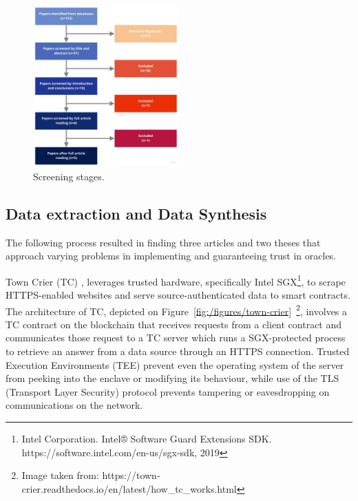 \documentclass[final,3p,12pt,twocolumn]{elsarticle}
\begin{document}
\begin{figure}[H]
  \begin{center}
    \leavevmode
    \includegraphics[width=0.5\textwidth]{figures/paper-screening.jpg}
    \caption{Screening stages.}
    \label{fig:/figures/paper-screening}
  \end{center}
\end{figure}


\subsection{Data extraction and Data Synthesis}\label{data-synthesis}

The following process resulted in finding three articles and two theses that approach varying problems in implementing and guaranteeing trust in oracles.

Town Crier (TC) \cite{Zhang2016a}, leverages trusted hardware, specifically Intel SGX\footnote{Intel Corporation. Intel® Software Guard Extensions SDK. https://software.intel.com/en-us/sgx-sdk, 2019}, to scrape HTTPS-enabled websites and serve source-authenticated data to smart contracts. The architecture of TC, depicted on Figure~\ref{fig:/figures/town-crier}~\footnote{Image taken from: https://town-crier.readthedocs.io/en/latest/how\_tc\_works.html}, involves a TC contract on the blockchain that receives requests from a client contract and communicates those request to a TC server which runs a SGX-protected process to retrieve an answer from a data source through an HTTPS connection. Trusted Execution Environments (TEE) prevent even the operating system of the server from peeking into the enclave or modifying its behaviour, while use of the TLS (Transport Layer Security) protocol prevents tampering or eavesdropping on communications on the network.
\end{document}
